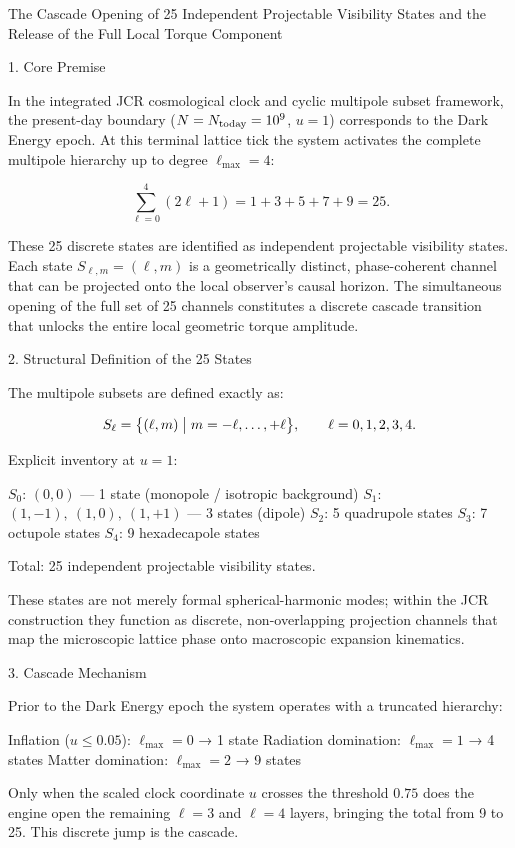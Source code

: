 The Cascade Opening of 25 Independent Projectable Visibility States and the Release of the Full Local Torque Component

1. Core Premise

In the integrated JCR cosmological clock and cyclic multipole subset framework, the present-day boundary (\(N = N_{\rm today} = 10^9\), \(u = 1\)) corresponds to the Dark Energy epoch. At this terminal lattice tick the system activates the complete multipole hierarchy up to degree \(\ell_{\max} = 4\):

\[
\sum_{\ell=0}^{4} (2\ell + 1) = 1 + 3 + 5 + 7 + 9 = 25.
\]

These 25 discrete states are identified as independent projectable visibility states. Each state \(S_{\ell,m} = (\ell,m)\) is a geometrically distinct, phase-coherent channel that can be projected onto the local observer’s causal horizon. The simultaneous opening of the full set of 25 channels constitutes a discrete cascade transition that unlocks the entire local geometric torque amplitude.

2. Structural Definition of the 25 States

The multipole subsets are defined exactly as:

\[
S_{\ell} = \bigl\{(\ell,m) \bigm| m = -\ell,\dots,+\ell\bigr\}, \qquad \ell = 0,1,2,3,4.
\]

Explicit inventory at \(u=1\):

\(S_0\): \((0,0)\) — 1 state (monopole / isotropic background)
\(S_1\): \((1,-1),\ (1,0),\ (1,+1)\) — 3 states (dipole)
\(S_2\): 5 quadrupole states
\(S_3\): 7 octupole states
\(S_4\): 9 hexadecapole states

Total: 25 independent projectable visibility states.

These states are not merely formal spherical-harmonic modes; within the JCR construction they function as discrete, non-overlapping projection channels that map the microscopic lattice phase onto macroscopic expansion kinematics.

3. Cascade Mechanism

Prior to the Dark Energy epoch the system operates with a truncated hierarchy:

Inflation (\(u\le0.05\)): \(\ell_{\max}=0\) → 1 state
Radiation domination: \(\ell_{\max}=1\) → 4 states
Matter domination: \(\ell_{\max}=2\) → 9 states

Only when the scaled clock coordinate \(u\) crosses the threshold \(0.75\) does the engine open the remaining \(\ell=3\) and \(\ell=4\) layers, bringing the total from 9 to 25. This discrete jump is the cascade.

